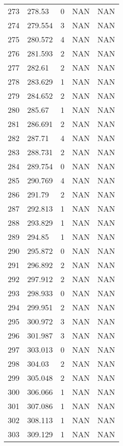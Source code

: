 \documentclass{article}
\begin{document}
\begin{longtable}{@{}lllll@{}}
				273 & 278.53  & 0     & NAN   & NAN   \\
				274 & 279.554 & 3     & NAN   & NAN   \\
				275 & 280.572 & 4     & NAN   & NAN   \\
				276 & 281.593 & 2     & NAN   & NAN   \\
				277 & 282.61  & 2     & NAN   & NAN   \\
				278 & 283.629 & 1     & NAN   & NAN   \\
				279 & 284.652 & 2     & NAN   & NAN   \\
				280 & 285.67  & 1     & NAN   & NAN   \\
				281 & 286.691 & 2     & NAN   & NAN   \\
				282 & 287.71  & 4     & NAN   & NAN   \\
				283 & 288.731 & 2     & NAN   & NAN   \\
				284 & 289.754 & 0     & NAN   & NAN   \\
				285 & 290.769 & 4     & NAN   & NAN   \\
				286 & 291.79  & 2     & NAN   & NAN   \\
				287 & 292.813 & 1     & NAN   & NAN   \\
				288 & 293.829 & 1     & NAN   & NAN   \\
				289 & 294.85  & 1     & NAN   & NAN   \\
				290 & 295.872 & 0     & NAN   & NAN   \\
				291 & 296.892 & 2     & NAN   & NAN   \\
				292 & 297.912 & 2     & NAN   & NAN   \\
				293 & 298.933 & 0     & NAN   & NAN   \\
				294 & 299.951 & 2     & NAN   & NAN   \\
				295 & 300.972 & 3     & NAN   & NAN   \\
				296 & 301.987 & 3     & NAN   & NAN   \\
				297 & 303.013 & 0     & NAN   & NAN   \\
				298 & 304.03  & 2     & NAN   & NAN   \\
				299 & 305.048 & 2     & NAN   & NAN   \\
				300 & 306.066 & 1     & NAN   & NAN   \\
				301 & 307.086 & 1     & NAN   & NAN   \\
				302 & 308.113 & 1     & NAN   & NAN   \\
				303 & 309.129 & 1     & NAN   & NAN   \\

\end{longtable}
\end{document}
